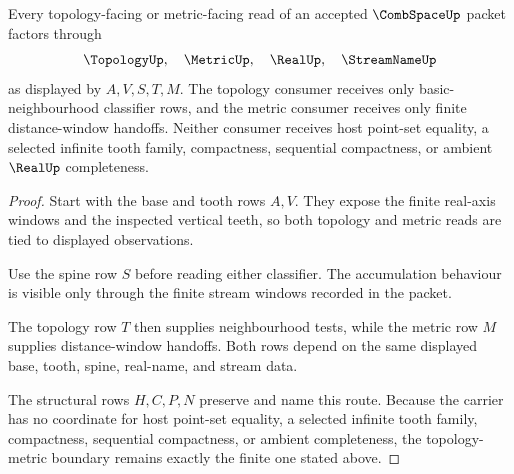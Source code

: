 \begin{theorem}
\label{thm:comb-space-topology-metric-boundary}
Every topology-facing or metric-facing read of an accepted $\CombSpaceUp$ packet factors through
$$
\TopologyUp,\quad
\MetricUp,\quad
\RealUp,\quad
\StreamNameUp
$$
as displayed by $A,V,S,T,M$. The topology consumer receives only basic-neighbourhood classifier rows, and the metric consumer receives only finite distance-window handoffs. Neither consumer receives host point-set equality, a selected infinite tooth family, compactness, sequential compactness, or ambient $\RealUp$ completeness.
\end{theorem}
\begin{proof}
Start with the base and tooth rows $A,V$. They expose the finite real-axis windows and the inspected vertical teeth, so both topology and metric reads are tied to displayed observations.

Use the spine row $S$ before reading either classifier. The accumulation behaviour is visible only through the finite stream windows recorded in the packet.

The topology row $T$ then supplies neighbourhood tests, while the metric row $M$ supplies distance-window handoffs. Both rows depend on the same displayed base, tooth, spine, real-name, and stream data.

The structural rows $H,C,P,N$ preserve and name this route. Because the carrier has no coordinate for host point-set equality, a selected infinite tooth family, compactness, sequential compactness, or ambient completeness, the topology-metric boundary remains exactly the finite one stated above.
\end{proof}


\begin{closurestatus}{\CombSpaceUp}
  \theoryclosure{\seedClosure}
  \formalstatus{\unformalizedV}
\end{closurestatus}

